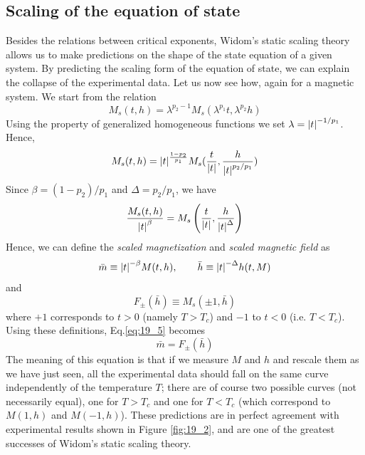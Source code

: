\documentclass[../../Main/Main.tex]{subfiles}
\begin{document}
\subsection{Scaling of the equation of state}
Besides the relations between critical exponents, Widom's static scaling theory allows us to make predictions on the shape of the state equation of a given system.
By predicting the scaling form of the equation of state, we can explain the collapse of the experimental data. Let us now see how, again for a magnetic system. We start from the relation
\begin{equation*}
  M_s (t,h) = \lambda ^{p_2 - 1} M_s (\lambda ^{p_1} t, \lambda ^{p_2} h)
\end{equation*}
Using the property of generalized homogeneous functions we set \( \lambda = \abs{t}^{-1/p_1}  \). Hence,
\begin{equation*}
  M_s (t,h) = \abs{t}^{\frac{1-p_2}{p_1}} M_s ( \frac{t}{\abs{t} }, \frac{h}{\abs{t}^{p_2/p_1 } })
\end{equation*}
Since \( \beta = (1-p_2)/p_1 \) and \( \Delta = p_2/p_1 \), we have
\begin{equation}
  \frac{M_s (t,h)}{\abs{t}^{\beta } } = M_s \left( \frac{t}{\abs{t} }, \frac{h}{\abs{t}^{\Delta } }\right)
  \label{eq:19_5}
\end{equation}
Hence, we can define the \emph{scaled magnetization} and \emph{scaled magnetic field}  as
\begin{equation}
    \bar{m} \equiv \abs{t}^{-\beta } M(t,h), \qquad \bar{h} \equiv \abs{t}^{-\Delta } h (t,M)
\end{equation}
and
\begin{equation}
  F_{\pm} ( \bar{h} ) \equiv M_s (\pm1, \bar{h} )
\end{equation}
where \( +1 \)  corresponds to \( t>0 \)  (namely \( T>T_c \)) and \( -1 \)  to \( t<0 \)  (i.e. \( T<T_c \)).
Using these definitions, Eq.\eqref{eq:19_5} becomes
\begin{equation}
  \bar{m} = F_{\pm} (\bar{h} )
\end{equation}
The meaning of this equation is that if we measure \( M \) and \( h \) and rescale them as we have just seen, all the experimental data should fall on the same curve independently of the temperature \( T \); there are of course two possible curves (not necessarily equal), one for \( T>T_c \)  and one for \( T<T_c \)  (which correspond to \( M(1,h) \) and \( M(-1,h) \)). These predictions are in perfect agreement with experimental results shown in Figure \ref{fig:19_2}, and are one of the greatest successes of Widom's static scaling theory.
\end{document}
